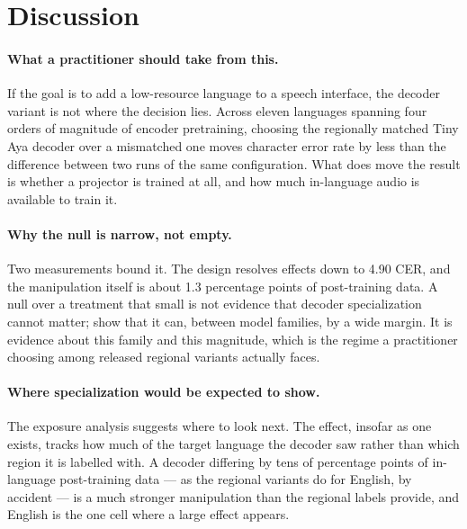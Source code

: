 \documentclass[11pt]{article}
\begin{document}




\section{Discussion}
\label{sec:discussion}

\paragraph{What a practitioner should take from this.}
If the goal is to add a low-resource language to a speech interface, the decoder variant is not
where the decision lies. Across eleven languages spanning four orders of magnitude of encoder
pretraining, choosing the regionally matched Tiny Aya decoder over a mismatched one moves
character error rate by less than the difference between two runs of the same configuration.
What does move the result is whether a projector is trained at all, and how much in-language
audio is available to train it.

\paragraph{Why the null is narrow, not empty.}
Two measurements bound it. The design resolves effects down to 4.90 CER, and the manipulation
itself is about 1.3 percentage points of post-training data. A null over a treatment that small
is not evidence that decoder specialization cannot matter; \citet{fongSpeechLLMsLowResource2025}
show that it can, between model families, by a wide margin. It is evidence about this family and
this magnitude, which is the regime a practitioner choosing among released regional variants
actually faces.

\paragraph{Where specialization would be expected to show.}
The exposure analysis suggests where to look next. The effect, insofar as one exists, tracks how
much of the target language the decoder saw rather than which region it is labelled with. A
decoder differing by tens of percentage points of in-language post-training data --- as the
regional variants do for English, by accident --- is a much stronger manipulation than the
regional labels provide, and English is the one cell where a large effect appears.
\end{document}
